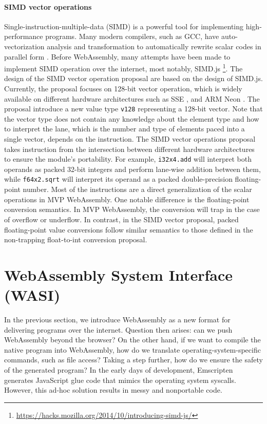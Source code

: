 \paragraph{SIMD vector operations}
Single-instruction-multiple-data (SIMD) is a powerful tool for implementing
high-performance programs. Many modern compilers, such as GCC, have
auto-vectorization analysis and transformation to automatically rewrite scalar
codes in parallel form \cite{auto-vec-gcc}. Before WebAssembly, many attempts
have been made to implement SIMD operation over the internet, most notably,
SIMD.js \footnote{\url{https://hacks.mozilla.org/2014/10/introducing-simd-js/}}.
The design of the SIMD vector operation proposal are based on the design of
SIMD.js. Currently, the proposal focuses on 128-bit vector operation, which is
widely available on different hardware architectures such as SSE
\cite{sse-intel}, and ARM Neon \cite{arm-neon}. The proposal introduce a new
value type \texttt{v128} representing a 128-bit vector. Note that the vector
type does not contain any knowledge about the element type and how to interpret
the lane, which is the number and type of elements paced into a single vector,
depends on the instruction. The SIMD vector operations proposal takes
instruction from the intersection between different hardware architectures to
ensure the module's portability. For example, \texttt{i32x4.add} will interpret
both operands as packed 32-bit integers and perform lane-wise addition between
them, while \texttt{f64x2.sqrt} will interpret its operand as a packed
double-precision floating-point number. Most of the instructions are a direct
generalization of the scalar operations in MVP WebAssembly. One notable
difference is the floating-point conversion semantics. In MVP WebAssembly, the
conversion will trap in the case of overflow or underflow. In contrast, in the
SIMD vector proposal, packed floating-point value conversions follow similar
semantics to those defined in the non-trapping float-to-int conversion proposal.

\section{WebAssembly System Interface (WASI)}

In the previous section, we introduce WebAssembly as a new format for delivering
programs over the internet. Question then arises: can we push WebAssembly beyond
the browser? On the other hand, if we want to compile the native program into
WebAssembly, how do we translate operating-system-specific commands, such as
file access? Taking a step further, how do we ensure the safety of the generated
program? In the early days of development, Emscripten generates JavaScript glue
code that mimics the operating system syscalls. However, this ad-hoc solution
results in messy and nonportable code.

